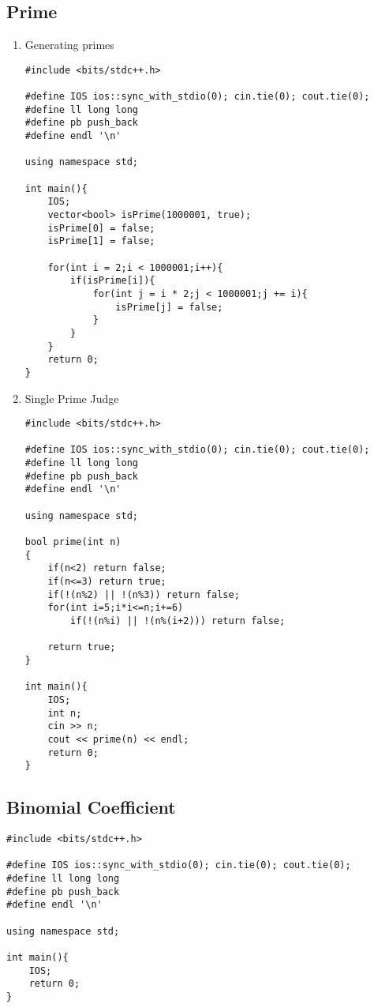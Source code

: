 \documentclass[12pt, a4paper]{article}
\begin{document}
\subsection{Prime}
\begin{enumerate}
\item {Generating primes}
\begin{lstlisting}
#include <bits/stdc++.h>

#define IOS ios::sync_with_stdio(0); cin.tie(0); cout.tie(0);
#define ll long long
#define pb push_back
#define endl '\n'

using namespace std;

int main(){
    IOS;
    vector<bool> isPrime(1000001, true);
    isPrime[0] = false;
    isPrime[1] = false;

    for(int i = 2;i < 1000001;i++){
        if(isPrime[i]){
            for(int j = i * 2;j < 1000001;j += i){
                isPrime[j] = false;
            }
        }
    }
    return 0;
}
\end{lstlisting}
\item {Single Prime Judge}
\begin{lstlisting}
#include <bits/stdc++.h>

#define IOS ios::sync_with_stdio(0); cin.tie(0); cout.tie(0);
#define ll long long
#define pb push_back
#define endl '\n'

using namespace std;

bool prime(int n)
{
    if(n<2) return false;
    if(n<=3) return true;
    if(!(n%2) || !(n%3)) return false;
    for(int i=5;i*i<=n;i+=6)
        if(!(n%i) || !(n%(i+2))) return false;
    
    return true;
}

int main(){
    IOS;
    int n;
    cin >> n;
    cout << prime(n) << endl;
    return 0;
}
\end{lstlisting}
\end{enumerate}

\subsection{Binomial Coefficient}
\begin{lstlisting}
#include <bits/stdc++.h>

#define IOS ios::sync_with_stdio(0); cin.tie(0); cout.tie(0);
#define ll long long
#define pb push_back
#define endl '\n'

using namespace std;

int main(){
    IOS;
    return 0;
}
\end{lstlisting}
\end{document}
